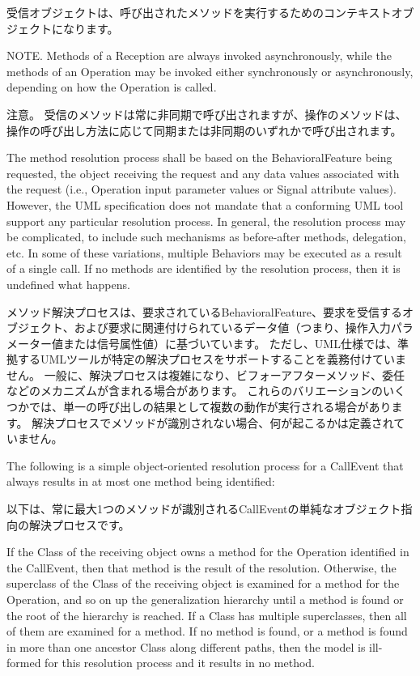 \documentclass[a4paper,11pt]{ltjsarticle}
\begin{document}
受信オブジェクトは、呼び出されたメソッドを実行するためのコンテキストオブジェクトになります。

NOTE. Methods of a Reception are always invoked asynchronously, while the methods of an Operation may be invoked either synchronously or asynchronously, depending on how the Operation is called.

注意。 受信のメソッドは常に非同期で呼び出されますが、操作のメソッドは、操作の呼び出し方法に応じて同期または非同期のいずれかで呼び出されます。


The method resolution process shall be based on the BehavioralFeature being requested, the object receiving the request and any data values associated with the request (i.e., Operation input parameter values or Signal attribute values).
However, the UML specification does not mandate that a conforming UML tool support any particular resolution process. 
In general, the resolution process may be complicated, to include such mechanisms as before-after methods, delegation, etc. 
In some of these variations, multiple Behaviors may be executed as a result of a single call. 
If no methods are identified by the resolution process, then it is undefined what happens.

メソッド解決プロセスは、要求されているBehavioralFeature、要求を受信するオブジェクト、および要求に関連付けられているデータ値（つまり、操作入力パラメーター値または信号属性値）に基づいています。
ただし、UML仕様では、準拠するUMLツールが特定の解決プロセスをサポートすることを義務付けていません。
一般に、解決プロセスは複雑になり、ビフォーアフターメソッド、委任などのメカニズムが含まれる場合があります。
これらのバリエーションのいくつかでは、単一の呼び出しの結果として複数の動作が実行される場合があります。
解決プロセスでメソッドが識別されない場合、何が起こるかは定義されていません。

The following is a simple object-oriented resolution process for a CallEvent that always results in at most one method being identified:

以下は、常に最大1つのメソッドが識別されるCallEventの単純なオブジェクト指向の解決プロセスです。

If the Class of the receiving object owns a method for the Operation identified in the CallEvent, then that method is the result of the resolution. 
Otherwise, the superclass of the Class of the receiving object is examined for a method for the Operation, and so on up the generalization hierarchy until a method is found or the root of the hierarchy is reached. 
If a Class has multiple superclasses, then all of them are examined for a method. 
If no method is found, or a method is found in more than one ancestor Class along different paths, then the model is ill-formed for this resolution process and it results in no method.
\end{document}
